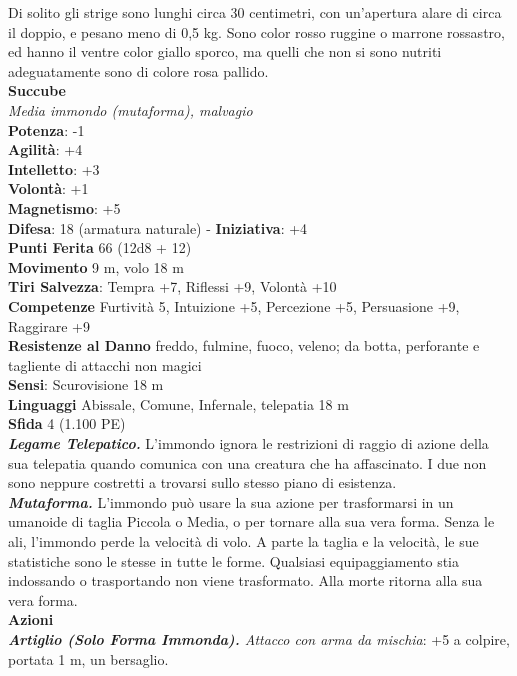 \begin{multicols}{2}
Di solito gli strige sono lunghi circa 30 centimetri, con un'apertura alare di circa il doppio, e pesano meno di 0,5 kg. Sono color rosso ruggine o marrone rossastro, ed hanno il ventre color giallo sporco, ma quelli che non si sono nutriti adeguatamente sono di colore rosa pallido.\\


\medskip\textbf{Succube}\\
\emph{Media immondo (mutaforma), malvagio}\\
\textbf{Potenza}: -1\\
\textbf{Agilità}: +4\\
\textbf{Intelletto}: +3\\
\textbf{Volontà}: +1\\
\textbf{Magnetismo}: +5\\
\textbf{Difesa}: 18 (armatura naturale) - \textbf{Iniziativa}: +4\\
\textbf{Punti Ferita} 66 (12d8 + 12)\\
\textbf{Movimento} 9 m, volo 18 m\\
\textbf{Tiri Salvezza}: Tempra +7, Riflessi +9, Volontà +10\\
\textbf{Competenze} Furtività 5, Intuizione +5, Percezione +5, Persuasione +9, Raggirare +9\\
\textbf{Resistenze al Danno} freddo, fulmine, fuoco, veleno; da botta, perforante e tagliente di attacchi non magici\\
\textbf{Sensi}: Scurovisione 18 m\\
\textbf{Linguaggi} Abissale, Comune, Infernale, telepatia 18 m \\
\textbf{Sfida} 4 (1.100 PE)\smallskip\\
\emph{\textbf{Legame Telepatico.}} L'immondo ignora le restrizioni di raggio di azione della sua telepatia quando comunica con una creatura che ha affascinato. I due non sono neppure costretti a trovarsi sullo stesso piano di esistenza.\\
\emph{\textbf{Mutaforma.}} L'immondo può usare la sua azione per trasformarsi in un umanoide di taglia Piccola o Media, o per tornare alla sua vera forma. Senza le ali, l'immondo perde la velocità di volo. A parte la taglia e la velocità, le sue statistiche sono le stesse in tutte le forme. Qualsiasi equipaggiamento stia indossando o trasportando non viene trasformato. Alla morte ritorna alla sua vera forma. \\
\smallskip\textbf{Azioni}\\
\emph{\textbf{Artiglio (Solo Forma Immonda).} Attacco con arma da mischia}: +5 a colpire, portata 1 m, un bersaglio.\\

\end{multicols}

